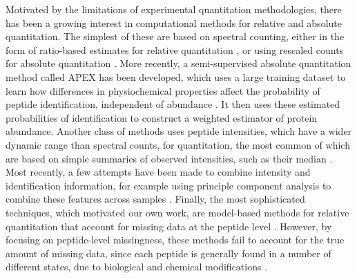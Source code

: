 Motivated by the limitations of experimental quantitation methodologies, there has been a growing interest in computational methods for relative and absolute quantitation.
The simplest of these are based on spectral counting, either in the form of ratio-based estimates for relative quantitation \citep{Liu:2004hv}, or using rescaled counts for absolute quantitation \citep{Ishihama:2005ir}.
More recently, a semi-supervised absolute quantitation method called APEX has been developed, which uses a large training dataset to learn how differences in physiochemical properties affect the probability of peptide identification, independent of abundance \citep{Lu:2006p10143}.
It then uses these estimated probabilities of identification to construct a weighted estimator of protein abundance.
%
Another class of methods uses peptide intensities, which have a wider dynamic range than spectral counts, for quantitation, the most common of which are based on simple summaries of observed intensities, such as their median \citep{deGodoy:2008jk, Silva:2005cn}.
Most recently, a few attempts have been made to combine intensity and identification information, for example using principle component analysis to combine these features across samples \citep[e.g.,][]{Dicker:2010ea}.
Finally, the most sophisticated techniques, which motivated our own work, are model-based methods for relative quantitation that account for missing data at the peptide level \citep{Karpievitch:2009wb,Luo:2009ff}.
However, by focusing on peptide-level missingness, these methods fail to account for the true amount of missing data, since each peptide is generally found in a number of different states, due to biological and chemical modifications \citep{Michalski:2011gm}.

